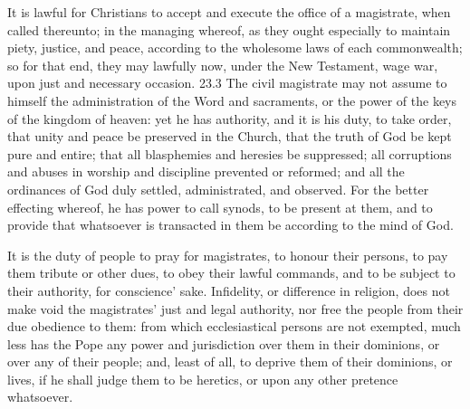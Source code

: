 \begin{outerlst}[left=0pt,labelsep=0pt]
\begin{innerlst}[resume*]
\item It is lawful for Christians to accept and execute the office of a magistrate, when called thereunto; in the managing whereof, as they ought especially to maintain piety, justice, and peace, according to the wholesome laws of each commonwealth; so for that end, they may lawfully now, under the New Testament, wage war, upon just and necessary occasion.  23.3 The civil magistrate may not assume to himself the administration of the Word and sacraments, or the power of the keys of the kingdom of heaven: yet he has authority, and it is his duty, to take order, that unity and peace be preserved in the Church, that the truth of God be kept pure and entire; that all blasphemies and heresies be suppressed; all corruptions and abuses in worship and discipline prevented or reformed; and all the ordinances of God duly settled, administrated, and observed. For the better effecting whereof, he has power to call synods, to be present at them, and to provide that whatsoever is transacted in them be according to the mind of God.   

\item It is the duty of people to pray for magistrates, to honour their persons, to pay them tribute or other dues, to obey their lawful commands, and to be subject to their authority, for conscience{}' sake. Infidelity, or difference in religion, does not make void the magistrates' just and legal authority, nor free the people from their due obedience to them: from which ecclesiastical persons are not exempted, much less has the Pope any power and jurisdiction over them in their dominions, or over any of their people; and, least of all, to deprive them of their dominions, or lives, if he shall judge them to be heretics, or upon any other pretence whatsoever.  
\end{innerlst}


\end{outerlst}
